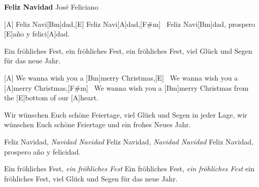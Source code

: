\documentclass[10pt]{article}
\begin{document}
\begin{guitar}
    \textbf{Feliz Navidad} José Feliciano


    [A] Feliz Navi[Bm]dad,[E] Feliz Navi[A]dad,[F#m]~
    Feliz Navi[Bm]dad, prospero [E]año y
    felici[A]dad.

    Ein fröhliches Fest, ein fröhliches Fest,
    ein fröhliches Fest, viel Glück und Segen
    für das neue Jahr.

    [A] We wanna wish you a [Bm]merry Christmas,[E]~
    We wanna wish you a [A]merry Christmas,[F#m]~
    We wanna wish you a [Bm]merry Christmas
    from the [E]bottom of our [A]heart.

    Wir wünschen Euch schöne Feiertage,
    viel Glück und Segen in jeder Lage,
    wir wünschen Euch schöne Feiertage
    und ein frohes Neues Jahr.

    Feliz Navidad, \emph{Navidad Navidad}
    Feliz Navidad, \emph{Navidad Navidad}
    Feliz Navidad, prospero año y
    felicidad.

    Ein fröhliches Fest, \emph{ein fröhliches Fest}
    Ein fröhliches Fest, \emph{ein fröhliches Fest}
    ein fröhliches Fest, viel Glück und Segen
    für das neue Jahr.
\end{guitar}
\end{document}
